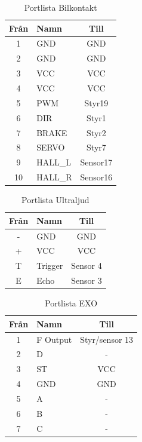 \documentclass[10pt,oneside,swedish]{lips}
\begin{document}
\begin{longtable}{|c|p{17mm}|c|}
  \caption{Portlista Bilkontakt}
  \hline
  Från & Namn &  Till\\
  \hline \hline
    1 & GND & GND\\
    \hline
    2 & GND & GND\\
    \hline
    3 & VCC & VCC\\
    \hline
    4 & VCC & VCC\\
    \hline
    5 & PWM & Styr19\\
    \hline
    6 & DIR & Styr1\\
    \hline
    7 & BRAKE & Styr2\\
    \hline
    8 & SERVO & Styr7\\
    \hline
    9 & HALL\_L & Sensor17\\
    \hline
    10 & HALL\_R & Sensor16\\
    \hline
\end{longtable}

\begin{longtable}{|c|p{17mm}|c|}
  \caption{Portlista Ultraljud}
  \hline 
  Från & Namn &  Till\\
  \hline \hline
    - & GND & GND\\
    \hline
    + & VCC & VCC\\
    \hline
    T & Trigger & Sensor 4\\
    \hline
    E & Echo & Sensor 3\\
    \hline    
\end{longtable}

\begin{longtable}{|c|p{17mm}|c|}
  \caption{Portlista EXO}
  \hline 
  Från & Namn &  Till\\
  \hline \hline
    1 & F Output & Styr/sensor 13\\
    \hline
    2 & D & -\\
    \hline
    3 & ST & VCC\\
    \hline
    4 & GND & GND\\
    \hline
    5 & A & -\\
    \hline
    6 & B & -\\
    \hline
    7 & C & -\\
  \hline
\end{longtable}
\end{document}

